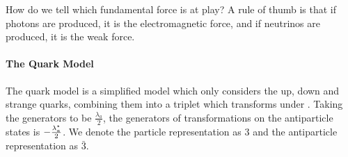 How do we tell which fundamental force is at play? A rule of thumb is that if photons are produced, it is the electromagnetic force, and if neutrinos are produced, it is the weak force.

\paragraph{The Quark Model}
The quark model is a simplified model which only considers the up, down and strange quarks, combining them into a triplet which transforms under . Taking the generators to be $\frac{\lambda_{a}}{2}$, the generators of transformations on the antiparticle states is $-\frac{\lambda_{a}^{\star}}{2}$. We denote the particle representation as $3$ and the antiparticle representation as $\bar{3}$.